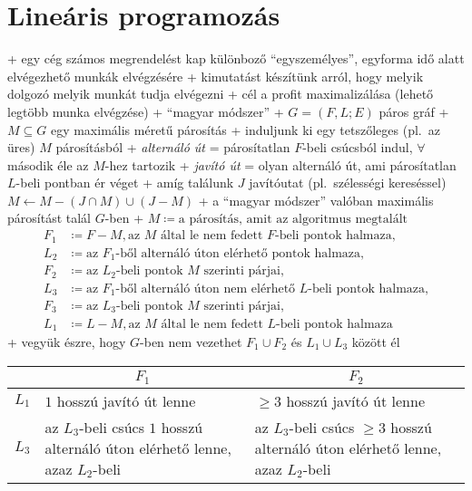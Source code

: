 
\section{Lineáris programozás}


+ \example egy cég számos megrendelést kap különboző ``egyszemélyes'',
  egyforma idő alatt elvégezhető munkák elvégzésére
  + kimutatást készítünk arról, hogy melyik dolgozó melyik munkát
    tudja elvégezni
  + cél a profit maximalizálása (lehető legtöbb munka elvégzése)
+ \alg ``magyar módszer''
  + \DataIn $G = (F, L; E)$ páros gráf
  + \DataOut $M \subseteq G$ egy maximális méretű párosítás
  + induljunk ki egy tetszőleges (pl.~az üres) $M$ párosításból
  + \emph{alternáló út} = párosítatlan $F$-beli csúcsból indul, $\forall$
    második éle az $M$-hez tartozik
    + \emph{javító út} = olyan alternáló út, ami párosítatlan $L$-beli
      pontban ér véget
  + amíg találunk $J$ javítóutat (pl.~szélességi kereséssel) \RA $M
    \gets M - (J \cap M) \cup (J - M)$
+ \thm a ``magyar módszer'' valóban maximális párosítást talál
  $G$-ben
  + \proof $M \coloneqq \text{a párosítás, amit az algoritmus
    megtalált}$
  \begin{align*}
    F_1 &\coloneqq F - M, \text{az $M$ által le nem fedett $F$-beli
          pontok halmaza,}\\
    L_2 &\coloneqq \text{az $F_1$-ből alternáló úton elérhető pontok
          halmaza,} \\
    F_2 &\coloneqq \text{az $L_2$-beli pontok $M$ szerinti párjai,} \\
    L_3 &\coloneqq \text{az $F_1$-ből alternáló úton nem elérhető
          $L$-beli pontok halmaza,} \\
    F_3 &\coloneqq \text{az $L_3$-beli pontok $M$ szerinti párjai,} \\
    L_1 &\coloneqq L - M, \text{az $M$ által le nem fedett $L$-beli pontok
          halmaza}
  \end{align*}
  + vegyük észre, hogy $G$-ben nem vezethet $F_1 \cup F_2$ és $L_1
    \cup L_3$ között él
    \par
    {\centering\begin{tabular}{c|p{6cm}|p{6cm}}
      & \multicolumn{1}{c|}{$F_1$} & \multicolumn{1}{c}{$F_2$} \\\hline
      $L_1$ & $1$ hosszú javító út lenne & $\ge 3$ hosszú javító út lenne \\\hline
      $L_3$ & az $L_3$-beli csúcs $1$ hosszú alternáló úton elérhető lenne, azaz $L_2$-beli
            & az $L_3$-beli csúcs $\ge 3$ hosszú alternáló úton elérhető lenne, azaz $L_2$-beli
    \end{tabular}\par}
